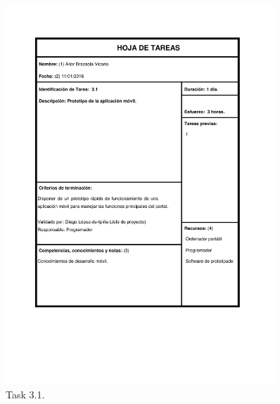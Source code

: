 \documentclass{DeustoFDP}
\begin{document}
\begin{figure}[H]
	\centering
	\includegraphics[width=0.9\textwidth]{fig/Tareas/31}
	\caption{Task 3.1.}
	\label{fig:t31}
\end{figure}
\end{document}
